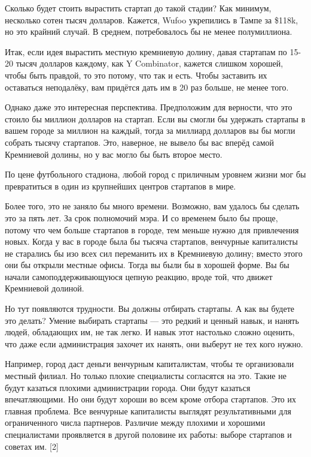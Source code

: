 \documentclass[ebook,12pt,oneside,openany]{memoir}
\begin{document}
Сколько будет стоить вырастить стартап до такой стадии? Как минимум,
несколько сотен тысяч долларов. Кажется, Wufoo укрепились в Тампе за
\$118k, но это крайний случай. В среднем, потребовалось бы не менее
полумиллиона.

Итак, если идея вырастить местную кремниевую долину, давая стартапам
по 15-20 тысяч долларов каждому, как Y Combinator, кажется слишком
хорошей, чтобы быть правдой, то это потому, что так и есть. Чтобы
заставить их оставаться неподалёку, вам придётся дать им в 20 раз
больше, не менее того.

Однако даже это интересная перспектива. Предположим для верности, что
это стоило бы миллион долларов на стартап. Если вы смогли бы удержать
стартапы в вашем городе за миллион на каждый, тогда за миллиард
долларов вы бы могли собрать тысячу стартапов. Это, наверное, не
вывело бы вас вперёд самой Кремниевой долины, но у вас могло бы быть
второе место.

По цене футбольного стадиона, любой город с приличным уровнем жизни
мог бы превратиться в один из крупнейших центров стартапов в мире.

Более того, это не заняло бы много времени. Возможно, вам удалось бы
сделать это за пять лет. За срок полномочий мэра. И со временем было
бы проще, потому что чем больше стартапов в городе, тем меньше нужно
для привлечения новых. Когда у вас в городе была бы тысяча стартапов,
венчурные капиталисты не старались бы изо всех сил переманить их в
Кремниевую долину; вместо этого они бы открыли местные офисы. Тогда вы
были бы в хорошей форме. Вы бы начали самоподдерживающуюся цепную
реакцию, вроде той, что движет Кремниевой долиной.

Но тут появляются трудности. Вы должны отбирать стартапы. А как вы
будете это делать? Умение выбирать стартапы — это редкий и ценный
навык, и нанять людей, обладающих им, не так легко. И навык этот
настолько сложно оценить, что даже если администрация захочет их
нанять, они выберут не тех кого нужно.

Например, город даст деньги венчурным капиталистам, чтобы те
организовали местный филиал. Но только плохие специалисты согласятся
на это. Такие не будут казаться плохими администрации города. Они
будут казаться впечатляющими. Но они будут хороши во всем кроме отбора
стартапов. Это их главная проблема. Все венчурные капиталисты выглядят
результативными для ограниченного числа партнеров. Различие между
плохими и хорошими специалистами проявляется в другой половине их
работы: выборе стартапов и советах им. [2]
\end{document}
